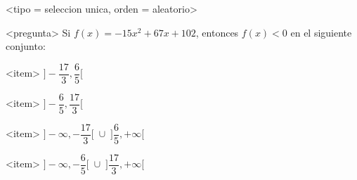 <tipo = seleccion unica, orden = aleatorio>

<pregunta>
Si $f(x) = -15x^2 +67x +102$, entonces $f(x) < 0$ en el siguiente conjunto:


<item>
$\bigg]-\dfrac{17}{3}, \dfrac{6}{5}\bigg[$

<item>
$\bigg]-\dfrac{6}{5}, \dfrac{17}{3}\bigg[$

<item>
$\bigg]{-}\infty, -\dfrac{17}{3}\bigg[\;\cup\; \bigg]\dfrac{6}{5},+\infty\bigg[$

<item>
$\bigg]{-}\infty, -\dfrac{6}{5}\bigg[\;\cup\; \bigg]\dfrac{17}{3},+\infty\bigg[$

 

